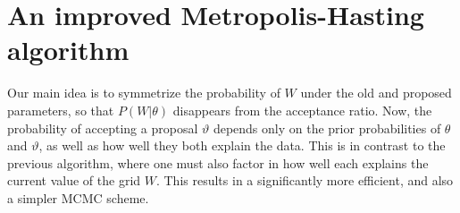 
\section{An improved Metropolis-Hasting algorithm}
Our main idea is to symmetrize the probability of $W$ under the old and proposed parameters, so that $P(W|\theta)$ disappears from the acceptance ratio. 
Now, the probability of accepting a proposal $\vartheta$ depends only on the prior probabilities of $\theta$ and $\vartheta$, as well as how well they both explain the data.
This is in contrast to the previous algorithm, where one must also factor in how well each explains the current value of the grid $W$.
This results in a significantly more efficient, and also a simpler MCMC scheme.

